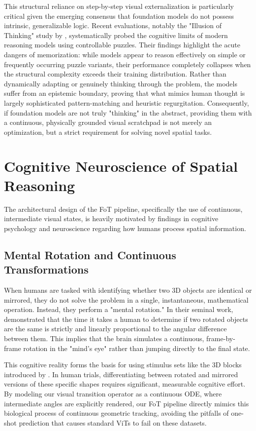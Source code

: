 \documentclass{l4proj}
\begin{document}
This structural reliance on step-by-step visual externalization is particularly critical given the emerging consensus that foundation models do not possess intrinsic, generalizable logic. Recent evaluations, notably the "Illusion of Thinking" study by \cite{shojaee2025illusion}, systematically probed the cognitive limits of modern reasoning models using controllable puzzles. Their findings highlight the acute dangers of memorization: while models appear to reason effectively on simple or frequently occurring puzzle variants, their performance completely collapses when the structural complexity exceeds their training distribution. Rather than dynamically adapting or genuinely thinking through the problem, the models suffer from an epistemic boundary, proving that what mimics human thought is largely sophisticated pattern-matching and heuristic regurgitation. Consequently, if foundation models are not truly "thinking" in the abstract, providing them with a continuous, physically grounded visual scratchpad is not merely an optimization, but a strict requirement for solving novel spatial tasks.


\section{Cognitive Neuroscience of Spatial Reasoning}
The architectural design of the FoT pipeline, specifically the use of continuous, intermediate visual states, is heavily motivated by findings in cognitive psychology and neuroscience regarding how humans process spatial information.

\subsection{Mental Rotation and Continuous Transformations}
When humans are tasked with identifying whether two 3D objects are identical or mirrored, they do not solve the problem in a single, instantaneous, mathematical operation. Instead, they perform a "mental rotation." In their seminal work, \cite{shepard1971mental} demonstrated that the time it takes a human to determine if two rotated objects are the same is strictly and linearly proportional to the angular difference between them. This implies that the brain simulates a continuous, frame-by-frame rotation in the "mind's eye" rather than jumping directly to the final state.

This cognitive reality forms the basis for using stimulus sets like the 3D blocks introduced by \cite{ganis2015new}. In human trials, differentiating between rotated and mirrored versions of these specific shapes requires significant, measurable cognitive effort. By modeling our visual transition operator as a continuous ODE, where intermediate angles are explicitly rendered, our FoT pipeline directly mimics this biological process of continuous geometric tracking, avoiding the pitfalls of one-shot prediction that causes standard ViTs to fail on these datasets.
\end{document}
